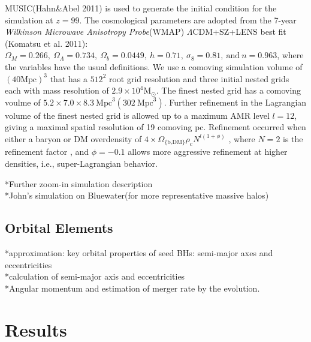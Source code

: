 \documentclass[useAMS,usenatbib]{mn2e}
\begin{document}
MUSIC(Hahn\&Abel 2011) is used to generate the initial condition for the
simulation at $z=99$. The cosmological parameters are adopted from the 7-year
\textit{Wilkinson Microwave Anisotropy Probe}(WMAP) $\Lambda\mbox{CDM}$+SZ+LENS
best fit (Komatsu et al. 2011):$\Omega_M=0.266, \ \Omega_{\Lambda}=0.734,\
\Omega_b=0.0449,\ h = 0.71,\ \sigma_8=0.81,\ \mbox{and}\ n=0.963$, where the
variables have the usual definitions. We use a comoving simulation volume of
$(40\mbox{Mpc})^3$ that has a $512^2$ root grid resolution and three initial
nested grids each with mass resolution of $2.9\times 10^4\mbox{M}_{\odot}$. The
finest nested grid has a comoving voulme of $5.2\times 7.0 \times 8.3\ 
\mbox{Mpc}^3(302\ \mbox{Mpc}^3)$. Further refinement in the Lagrangian volume of
the finest nested grid is allowed up to a maximum AMR level $l = 12$, giving a
maximal spatial resolution of 19 comoving pc. Refinement occurred when either a
baryon or DM overdensity of $4\times\Omega_{\{\textrm{b,DM\}}}\rho_cN^{l(1+\phi)}$
, where $N=2$ is the refinement factor , and $\phi=-0.1$ allows more aggressive
refinement at higher densities, i.e., super-Lagrangian behavior.



*Further zoom-in simulation description\\
*John's simulation on Bluewater(for more representative massive halos)
\subsection{Orbital Elements}
*approximation: key orbital properties of seed BHs: semi-major axes and
eccentricities\\
*calculation of semi-major axis and eccentricities\\
*Angular momentum and estimation of merger rate by the evolution.\\

\section{Results}
\end{document}
